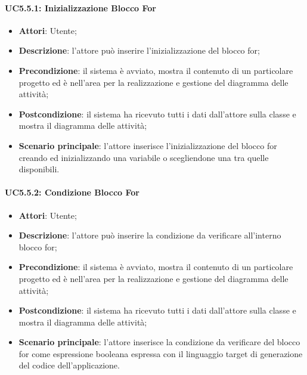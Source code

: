 \paragraph{UC5.5.1: Inizializzazione Blocco For}
\label{UC5.5.1}
\begin{itemize}
	\item \textbf{Attori}: Utente;
	\item \textbf{Descrizione}: l'attore può inserire l'inizializzazione del blocco for;
	\item \textbf{Precondizione}: il sistema è avviato, mostra il contenuto di un particolare progetto ed è nell'area per la realizzazione e gestione del diagramma delle attività;
	\item \textbf{Postcondizione}: il sistema ha ricevuto tutti i dati dall'attore sulla classe e mostra il diagramma delle attività;
	\item \textbf{Scenario principale}: l'attore inserisce l'inizializzazione del blocco for creando ed inizializzando una variabile o scegliendone una tra quelle disponibili.
\end{itemize}

\paragraph{UC5.5.2: Condizione Blocco For}
\label{UC5.5.2}
\begin{itemize}
	\item \textbf{Attori}: Utente;
	\item \textbf{Descrizione}: l'attore può inserire la condizione da verificare all'interno blocco for;
	\item \textbf{Precondizione}: il sistema è avviato, mostra il contenuto di un particolare progetto ed è nell'area per la realizzazione e gestione del diagramma delle attività;
	\item \textbf{Postcondizione}: il sistema ha ricevuto tutti i dati dall'attore sulla classe e mostra il diagramma delle attività;
	\item \textbf{Scenario principale}: l'attore inserisce la condizione da verificare del blocco for come espressione booleana espressa con il linguaggio target di generazione del codice dell'applicazione.
\end{itemize}

